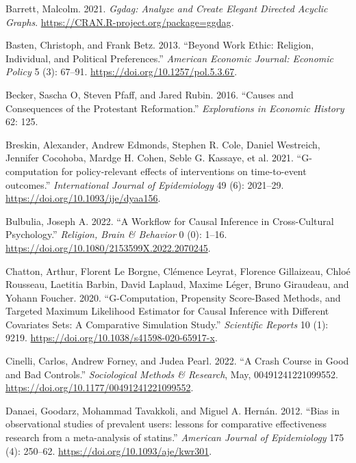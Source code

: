 \documentclass[
  singlecolumn]{report}
\newlength{\cslhangindent}
\newlength{\cslentryspacingunit} %
\newenvironment{CSLReferences}[2] %
 {%
  \setlength{\parindent}{0pt}
  \ifodd #1
  \let\oldpar\par
  \def\par{\hangindent=\cslhangindent\oldpar}
  \fi
  \setlength{\parskip}{#2\cslentryspacingunit}
 }%
 {}
\begin{document}
\hypertarget{refs}{}
\begin{CSLReferences}{1}{0}
\leavevmode{}%
Barrett, Malcolm. 2021. \emph{Ggdag: Analyze and Create Elegant Directed
Acyclic Graphs}. \url{https://CRAN.R-project.org/package=ggdag}.

\leavevmode{}%
Basten, Christoph, and Frank Betz. 2013. {``Beyond Work Ethic: Religion,
Individual, and Political Preferences.''} \emph{American Economic
Journal: Economic Policy} 5 (3): 67--91.
\url{https://doi.org/10.1257/pol.5.3.67}.

\leavevmode{}%
Becker, Sascha O, Steven Pfaff, and Jared Rubin. 2016. {``Causes and
Consequences of the Protestant Reformation.''} \emph{Explorations in
Economic History} 62: 125.

\leavevmode{}%
Breskin, Alexander, Andrew Edmonds, Stephen R. Cole, Daniel Westreich,
Jennifer Cocohoba, Mardge H. Cohen, Seble G. Kassaye, et al. 2021.
{``G-computation for policy-relevant effects of interventions on
time-to-event outcomes.''} \emph{International Journal of Epidemiology}
49 (6): 2021--29. \url{https://doi.org/10.1093/ije/dyaa156}.

\leavevmode{}%
Bulbulia, Joseph A. 2022. {``A Workflow for Causal Inference in
Cross-Cultural Psychology.''} \emph{Religion, Brain \& Behavior} 0 (0):
1--16. \url{https://doi.org/10.1080/2153599X.2022.2070245}.

\leavevmode{}%
Chatton, Arthur, Florent Le Borgne, Clémence Leyrat, Florence
Gillaizeau, Chloé Rousseau, Laetitia Barbin, David Laplaud, Maxime
Léger, Bruno Giraudeau, and Yohann Foucher. 2020. {``G-Computation,
Propensity Score-Based Methods, and Targeted Maximum Likelihood
Estimator for Causal Inference with Different Covariates Sets: A
Comparative Simulation Study.''} \emph{Scientific Reports} 10 (1): 9219.
\url{https://doi.org/10.1038/s41598-020-65917-x}.

\leavevmode{}%
Cinelli, Carlos, Andrew Forney, and Judea Pearl. 2022. {``A Crash Course
in Good and Bad Controls.''} \emph{Sociological Methods \& Research},
May, 00491241221099552. \url{https://doi.org/10.1177/00491241221099552}.

\leavevmode{}%
Danaei, Goodarz, Mohammad Tavakkoli, and Miguel A. Hernán. 2012. {``Bias
in observational studies of prevalent users: lessons for comparative
effectiveness research from a meta-analysis of statins.''}
\emph{American Journal of Epidemiology} 175 (4): 250--62.
\url{https://doi.org/10.1093/aje/kwr301}.


\end{CSLReferences}
\end{document}
